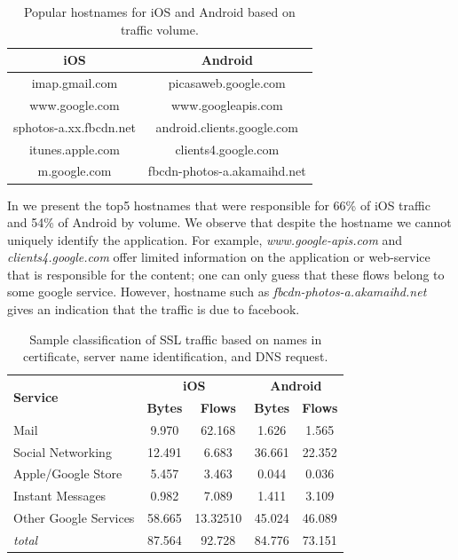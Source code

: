 \begin{table}
\centering
\begin{small}
\begin{tabular}{|c|c|}
\hline
{\bf iOS} & {\bf Android} \tabularnewline
\hline
imap.gmail.com & picasaweb.google.com \tabularnewline
www.google.com & www.googleapis.com \tabularnewline
sphotos-a.xx.fbcdn.net & android.clients.google.com \tabularnewline
itunes.apple.com  & clients4.google.com \tabularnewline
m.google.com & fbcdn-photos-a.akamaihd.net \tabularnewline
\hline
\end{tabular}
\end{small}
\caption{Popular hostnames for iOS and Android based on traffic volume.}
\label{tab:sslclassify-popular-host}
\end{table}

In  we present the top5 hostnames that were responsible for 66\% of iOS traffic and 54\% of Android by volume. 
We observe that despite the hostname we cannot uniquely identify the application. 
For example, \emph{www.google-apis.com} and \emph{clients4.google.com} offer limited information on the application or web-service that is responsible for the content; one can only guess that these flows belong to some google service.
However, hostname such as \emph{fbcdn-photos-a.akamaihd.net} gives an indication that the traffic is due to facebook.

\begin{table}
\centering
\begin{small}
\begin{tabular}{|p{}|c|c|c|c|}
\hline
\multirow{2}{*}{\bf Service} & \multicolumn{2}{c|}{\bf iOS} &  \multicolumn{2}{c|}{\bf Android} \tabularnewline
\cline{2-5}
  & {\bf Bytes}  & {\bf Flows} & {\bf Bytes} & {\bf Flows} \tabularnewline
\hline
Mail                 & 9.970    & 62.168   & 1.626  & 1.565 \tabularnewline
\hline
Social Networking    & 12.491   & 6.683    & 36.661 & 22.352 \tabularnewline
\hline
Apple/Google Store   & 5.457    & 3.463    & 0.044  & 0.036 \tabularnewline
\hline
Instant Messages     & 0.982    & 7.089    & 1.411  & 3.109 \tabularnewline
\hline
Other Google Services & 58.665   & 13.32510 & 45.024 & 46.089 \tabularnewline
\hline
\emph{total}         & 87.564   & 92.728   & 84.776 & 73.151 \tabularnewline
\hline
\end{tabular} 
\end{small}
\caption{Sample classification of SSL traffic based on names in certificate, server name identification, and DNS request.}
\label{tab:classify-ssl-traffic}
\end{table}

